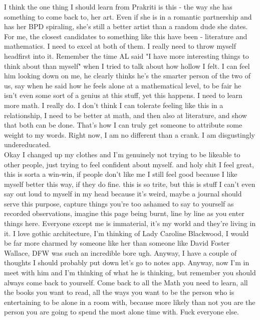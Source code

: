 \noindent {}

I think the one thing I should learn from Prakriti is this - the way she has something to come back to, her art. Even if she is in a romantic partnership and has her BPD spiraling, she's still a better artist than a random dude she dates. For me, the closest candidates to something like this have been - literature and mathematics. I need to excel at both of them. I really need to throw myself headfirst into it. Remember the time AL said "I have more interesting things to think about than myself" when I tried to talk about how hollow I felt. I can feel him looking down on me, he clearly thinks he's the smarter person of the two of us, say when he said how he feels alone at a mathematical level, to be fair he isn't even some sort of a genius at this stuff, yet this happens. I need to learn more math. I really do. I don't think I can tolerate feeling like this in a relationship, I need to be better at math, and then also at literature, and show that both can be done. That's how I can truly get someone to attribute some weight to my words. Right now, I am no different than a crank. I am disgustingly undereducated.\\

Okay I changed up my clothes and I'm genuinely not trying to be likeable to other people, just trying to feel confident about myself. and holy shit I feel great, this is sorta a win-win, if people don't like me I still feel good because I like myself better this way, if they do fine. this is so trite, but this is stuff I can't even say out loud to myself in my head because it's weird, maybe a journal should serve this purpose, capture things you're too ashamed to say to yourself as recorded observations, imagine this page being burnt, line by line as you enter things here. Everyone except me is immaterial, it's my world and they're living in it. I love gothic architecture, I'm thinking of Lady Caroline Blackwood, I would be far more charmed by someone like her than someone like David Foster Wallace, DFW was such an incredible bore ugh. Anyway, I have a couple of thoughts I should probably put down let's go to notes app. Anyway, now I'm in meet with him and I'm thinking of what he is thinking, but remember you should always come back to yourself. Come back to all the Math you need to learn, all the books you want to read, all the ways you want to be the person who is entertaining to be alone in a room with, because more likely than not you are the person you are going to spend the most alone time with. Fuck everyone else.